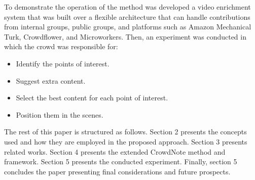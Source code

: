 To demonstrate the operation of the method was developed a video enrichment system that was built over a flexible architecture that can handle contributions from internal groups, public groups, and platforms such as Amazon Mechanical Turk, Crowdflower, and Microworkers. Then, an experiment was conducted in which the crowd was responsible for:
\begin{itemize}
\item Identify the points of interest.
\item Suggest extra content.
\item Select the best content for each point of interest.
\item Position them in the scenes. 
\end{itemize}

The rest of this paper is structured as follows. Section 2 presents the concepts used and how they are employed in the proposed approach. Section 3 presents related works. Section 4 presents the extended CrowdNote method and framework. Section 5 presents the conducted experiment. Finally, section 5 concludes the paper presenting final considerations and future prospects.